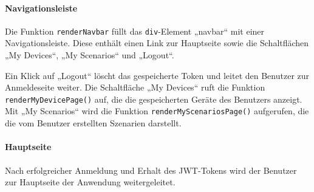 \documentclass[12pt, letterpaper]{article}
\begin{document}
  \paragraph{Navigationsleiste}
  \par \textbf{}
  \par Die Funktion \texttt{renderNavbar} füllt das \texttt{div}-Element „navbar“ mit einer Navigationsleiste. Diese enthält einen Link zur Hauptseite sowie die Schaltflächen „My Devices“, „My Scenarios“ und „Logout“. 
  \par Ein Klick auf „Logout“  löscht das gespeicherte Token und leitet den Benutzer zur Anmeldeseite weiter. Die Schaltfläche „My Devices“ ruft die Funktion \texttt{renderMyDevicePage()} auf, die die gespeicherten Geräte des Benutzers anzeigt. Mit „My Scenarios“ wird die Funktion \texttt{renderMyScenariosPage()} aufgerufen, die die vom Benutzer erstellten Szenarien darstellt.
  \paragraph{Hauptseite}
  \par \textbf{}
  \par Nach erfolgreicher Anmeldung und Erhalt des JWT-Tokens wird der Benutzer zur Hauptseite der Anwendung weitergeleitet.
\end{document}
